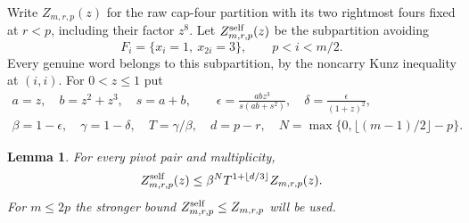 \documentclass[11pt]{amsart}
\newtheorem{lemma}[theorem]{Lemma}
\theoremstyle{definition}
\theoremstyle{remark}
\numberwithin{equation}{section}
\begin{document}
Write $Z_{m,r,p}(z)$ for the raw cap-four partition with its two
rightmost fours fixed at $r<p$, including their factor $z^8$.
Let $Z^{\rm self}_{m,r,p}(z)$ be the subpartition avoiding
\[
 F_i=\{x_i=1,\ x_{2i}=3\},\qquad p<i<m/2.
\]
Every genuine word belongs to this subpartition, by the noncarry Kunz
inequality at $(i,i)$. For $0<z\le1$ put
\begin{gather*}
 a=z,\quad b=z^2+z^3,\quad s=a+b,\qquad
 \epsilon=\frac{abz^3}{s(ab+s^2)},\quad
 \delta=\frac{\epsilon}{(1+z)^2},\\
 \beta=1-\epsilon,\quad \gamma=1-\delta,\quad T=\gamma/\beta,
 \quad d=p-r,\quad N=\max\{0,\lfloor(m-1)/2\rfloor-p\}.
\end{gather*}

\begin{lemma}\label{mass:contraction}
For every pivot pair and multiplicity,
\begin{equation}\label{mass:feedback}
 Z^{\rm self}_{m,r,p}(z)
 \le \beta^N T^{1+\lfloor d/3\rfloor}Z_{m,r,p}(z).
\end{equation}
For $m\le2p$ the stronger bound $Z^{\rm self}_{m,r,p}\le Z_{m,r,p}$
will be used.
\end{lemma}
\end{document}
